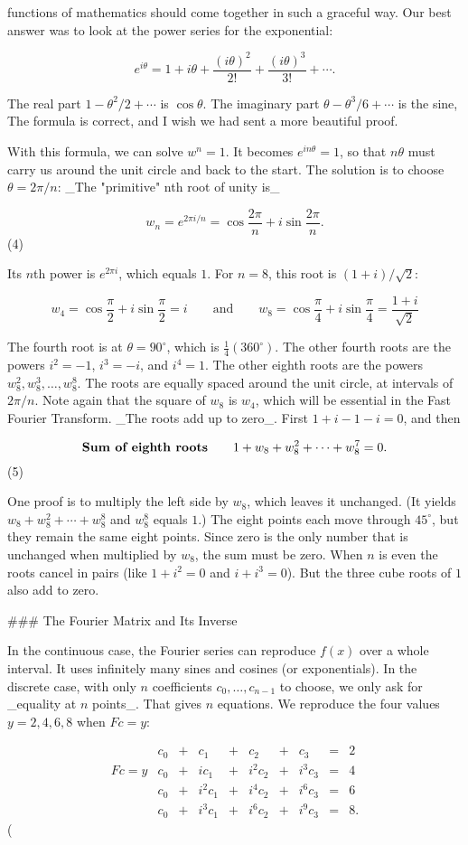functions of mathematics should come together in such a graceful way. Our best answer was to look at the power series for the exponential:

\[e^{i\theta}=1+i\theta+\frac{(i\theta)^{2}}{2!}+\frac{(i\theta)^{3}}{3!}+\cdots.\]

The real part \(1-\theta^{2}/2+\cdots\) is \(\cos\theta\). The imaginary part \(\theta-\theta^{3}/6+\cdots\) is the sine, The formula is correct, and I wish we had sent a more beautiful proof.

With this formula, we can solve \(w^{n}=1\). It becomes \(e^{in\theta}=1\), so that \(n\theta\) must carry us around the unit circle and back to the start. The solution is to choose \(\theta=2\pi/n\): _The "primitive" nth root of unity is_

\[w_{n}=e^{2\pi i/n}=\cos\frac{2\pi}{n}+i\sin\frac{2\pi}{n}.\] (4)

Its \(n\)th power is \(e^{2\pi i}\), which equals \(1\). For \(n=8\), this root is \((1+i)/\sqrt{2}\):

\[w_{4}=\cos\frac{\pi}{2}+i\sin\frac{\pi}{2}=i\qquad\text{and}\qquad w_{8}=\cos \frac{\pi}{4}+i\sin\frac{\pi}{4}=\frac{1+i}{\sqrt{2}}\]

The fourth root is at \(\theta=90^{\circ}\), which is \(\frac{1}{4}(360^{\circ})\). The other fourth roots are the powers \(i^{2}=-1\), \(i^{3}=-i\), and \(i^{4}=1\). The other eighth roots are the powers \(w_{8}^{2},w_{8}^{3},\ldots,w_{8}^{8}\). The roots are equally spaced around the unit circle, at intervals of \(2\pi/n\). Note again that the square of \(w_{8}\) is \(w_{4}\), which will be essential in the Fast Fourier Transform. _The roots add up to zero_. First \(1+i-1-i=0\), and then

\[\text{\bf Sum of eighth roots}\qquad 1+w_{8}+w_{8}^{2}+\cdots+w_{8}^{7}=0.\] (5)

One proof is to multiply the left side by \(w_{8}\), which leaves it unchanged. (It yields \(w_{8}+w_{8}^{2}+\cdots+w_{8}^{8}\) and \(w_{8}^{8}\) equals \(1\).) The eight points each move through \(45^{\circ}\), but they remain the same eight points. Since zero is the only number that is unchanged when multiplied by \(w_{8}\), the sum must be zero. When \(n\) is even the roots cancel in pairs (like \(1+i^{2}=0\) and \(i+i^{3}=0\)). But the three cube roots of \(1\) also add to zero.

### The Fourier Matrix and Its Inverse

In the continuous case, the Fourier series can reproduce \(f(x)\) over a whole interval. It uses infinitely many sines and cosines (or exponentials). In the discrete case, with only \(n\) coefficients \(c_{0},\ldots,c_{n-1}\) to choose, we only ask for _equality at \(n\) points_. That gives \(n\) equations. We reproduce the four values \(y=2,4,6,8\) when \(Fc=y\):

\[\begin{array}{ccccccccc}&c_{0}&+&c_{1}&+&c_{2}&+&c_{3}&=&2\\ Fc=y&c_{0}&+&ic_{1}&+&i^{2}c_{2}&+&i^{3}c_{3}&=&4\\ &c_{0}&+&i^{2}c_{1}&+&i^{4}c_{2}&+&i^{6}c_{3}&=&6\\ &c_{0}&+&i^{3}c_{1}&+&i^{6}c_{2}&+&i^{9}c_{3}&=&8.\end{array}\] ( 
